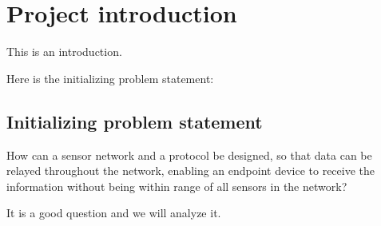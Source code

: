 \chapter{Project introduction}
This is an introduction.

Here is the initializing problem statement:

\section{Initializing problem statement}
How can a sensor network and a protocol be designed, so that data can be relayed throughout the network, enabling an endpoint device to receive the information without being within range of all sensors in the network?

It is a good question and we will analyze it.